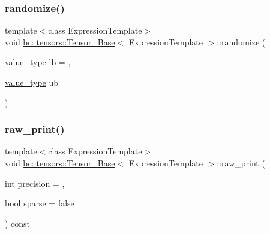 \subsubsection{\texorpdfstring{randomize()}{randomize()}}
{\footnotesize\ttfamily template$<$class Expression\+Template$>$ \\
void \hyperlink{classbc_1_1tensors_1_1Tensor__Base}{bc\+::tensors\+::\+Tensor\+\_\+\+Base}$<$ Expression\+Template $>$\+::randomize (\begin{DoxyParamCaption}\item[{\hyperlink{classbc_1_1tensors_1_1Expression__Base_acda5b4e228c9b3cb9174258d5caf860a}{value\+\_\+type}}]{lb = {},  }\item[{\hyperlink{classbc_1_1tensors_1_1Expression__Base_acda5b4e228c9b3cb9174258d5caf860a}{value\+\_\+type}}]{ub = {} }\end{DoxyParamCaption})\hspace{0.3cm}{\ttfamily [inline]}}

\mbox{\label{classbc_1_1tensors_1_1Tensor__Base_af16daf441642b2c0bb573530f41190f1}} 
\subsubsection{\texorpdfstring{raw\+\_\+print()}{raw\_print()}}
{\footnotesize\ttfamily template$<$class Expression\+Template$>$ \\
void \hyperlink{classbc_1_1tensors_1_1Tensor__Base}{bc\+::tensors\+::\+Tensor\+\_\+\+Base}$<$ Expression\+Template $>$\+::raw\+\_\+print (\begin{DoxyParamCaption}\item[{int}]{precision = {},  }\item[{bool}]{sparse = {\ttfamily false} }\end{DoxyParamCaption}) const\hspace{0.3cm}{\ttfamily [inline]}}

\mbox{\label{classbc_1_1tensors_1_1Tensor__Base_a62eb4a1d5290265d64cccd58d69a89eb}} 
